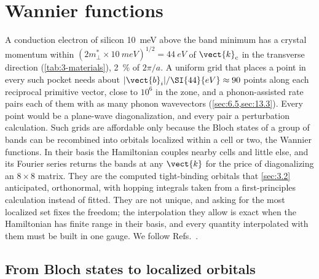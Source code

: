 \section{Wannier functions}\label{sec:3.6}

A conduction electron of silicon \SI{10}{meV} above the band minimum has a crystal momentum within $(2m^*_\perp\times\SI{10}{meV})^{1/2} = \SI{44}{eV}$ of $\vect{k}_{\mathrm{c}}$ in the transverse direction (\cref{tab:3-materials}), \SI{2}{\percent} of $2\pi/a$. A uniform grid that places a point in every such pocket needs about $|\vect{b}_i|/\SI{44}{eV} \approx 90$ points along each reciprocal primitive vector, close to $10^6$ in the zone, and a phonon-assisted rate pairs each of them with as many phonon wavevectors (\cref{sec:6.5,sec:13.3}). Every point would be a plane-wave diagonalization, and every pair a perturbation calculation. Such grids are affordable only because the Bloch states of a group of bands can be recombined into orbitals localized within a cell or two, the Wannier functions. In their basis the Hamiltonian couples nearby cells and little else, and its Fourier series returns the bands at any $\vect{k}$ for the price of diagonalizing an $8\times8$ matrix. They are the computed tight-binding orbitals that \cref{sec:3.2} anticipated, orthonormal, with hopping integrals taken from a first-principles calculation instead of fitted. They are not unique, and asking for the most localized set fixes the freedom; the interpolation they allow is exact when the Hamiltonian has finite range in their basis, and every quantity interpolated with them must be built in one gauge. We follow Refs.~\cite{marzari1997maximally,souza2001maximally,marzari2012maximally}.

\subsection{From Bloch states to localized orbitals}

